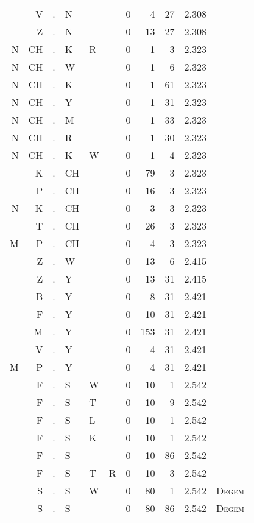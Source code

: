 \begin{longtable}{r@{ } r@{ } c@{ } l@{ } l@{ } l@{ } r r r r l }
  & V & . & N &   &   & 0 & 4 & 27 & 2.308 &  \\
  & Z & . & N &   &   & 0 & 13 & 27 & 2.308 &  \\
N & CH & . & K & R &   & 0 & 1 & 3 & 2.323 &  \\
N & CH & . & W &   &   & 0 & 1 & 6 & 2.323 &  \\
N & CH & . & K &   &   & 0 & 1 & 61 & 2.323 &  \\
N & CH & . & Y &   &   & 0 & 1 & 31 & 2.323 &  \\
N & CH & . & M &   &   & 0 & 1 & 33 & 2.323 &  \\
N & CH & . & R &   &   & 0 & 1 & 30 & 2.323 &  \\
N & CH & . & K & W &   & 0 & 1 & 4 & 2.323 &  \\
  & K & . & CH &   &   & 0 & 79 & 3 & 2.323 &  \\
  & P & . & CH &   &   & 0 & 16 & 3 & 2.323 &  \\
N & K & . & CH &   &   & 0 & 3 & 3 & 2.323 &  \\
  & T & . & CH &   &   & 0 & 26 & 3 & 2.323 &  \\
M & P & . & CH &   &   & 0 & 4 & 3 & 2.323 &  \\
  & Z & . & W &   &   & 0 & 13 & 6 & 2.415 &  \\
  & Z & . & Y &   &   & 0 & 13 & 31 & 2.415 &  \\
  & B & . & Y &   &   & 0 & 8 & 31 & 2.421 &  \\
  & F & . & Y &   &   & 0 & 10 & 31 & 2.421 &  \\
  & M & . & Y &   &   & 0 & 153 & 31 & 2.421 &  \\
  & V & . & Y &   &   & 0 & 4 & 31 & 2.421 &  \\
M & P & . & Y &   &   & 0 & 4 & 31 & 2.421 &  \\
  & F & . & S & W &   & 0 & 10 & 1 & 2.542 &  \\
  & F & . & S & T &   & 0 & 10 & 9 & 2.542 &  \\
  & F & . & S & L &   & 0 & 10 & 1 & 2.542 &  \\
  & F & . & S & K &   & 0 & 10 & 1 & 2.542 &  \\
  & F & . & S &   &   & 0 & 10 & 86 & 2.542 &  \\
  & F & . & S & T & R & 0 & 10 & 3 & 2.542 &  \\
  & S & . & S & W &   & 0 & 80 & 1 & 2.542 & \textsc{Degem} \\
  & S & . & S &   &   & 0 & 80 & 86 & 2.542 & \textsc{Degem} \\

\end{longtable}
